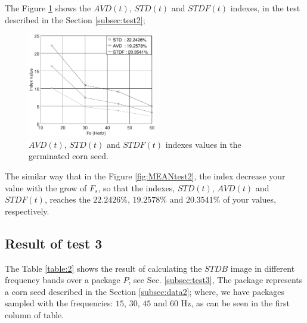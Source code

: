 \documentclass[review]{elsarticle}
\begin{document}
The Figure \ref{fig:INDEXtest2} shows the $AVD(t)$, $STD(t)$ and $STDF(t)$ indexes,
in the test described in the Section \ref{subsec:test2};
\begin{figure}[ht!]
    \centering
    \includegraphics[width=0.5\textwidth]{FPS_Semilla_3_3diasALL.eps}
    \caption{$AVD(t)$, $STD(t)$ and $STDF(t)$ indexes values in the germinated corn seed.}\label{fig:INDEXtest2}
\end{figure}
The similar way that in the Figure \ref{fig:MEANtest2},
the index decrease your value with the grow of $F_s$,
so that the indexes, 
$STD(t)$, $AVD(t)$  and $STDF(t)$, 
reaches the $22.2426\%$, $19.2578\%$ and $20.3541\%$ of your values, 
respectively.


\subsection{Result of test 3}
\label{subsec:resulttest3}
The Table \ref{table:2} shows the result of calculating the $STDB$ image
in different frequency bands over a package $P$, see Sec. \ref{subsec:test3}, 
The package represents  a corn seed described in the Section \ref{subsec:data2};
where, we have packages sampled with the frequencies: $15$, $30$, $45$ and $60$ Hz, as
can be seen in the first column of table.
\end{document}
